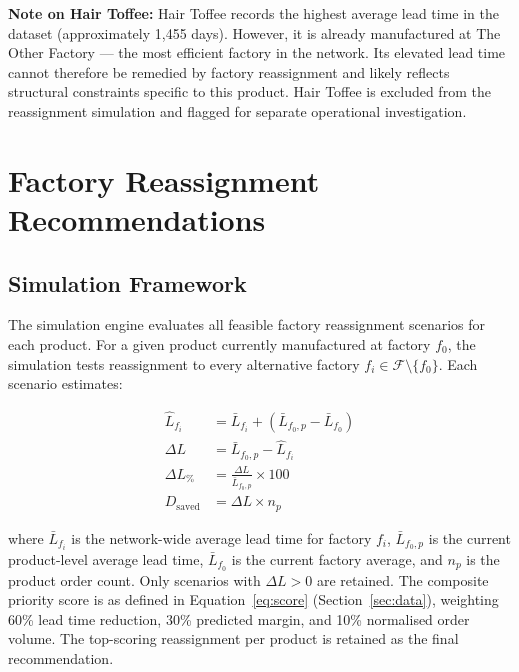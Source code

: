 \documentclass[12pt, a4paper]{article}
\begin{document}
\textbf{Note on Hair Toffee:} Hair Toffee records the
highest average lead time in the dataset
(approximately 1,455 days). However, it is already
manufactured at The Other Factory --- the most efficient
factory in the network. Its elevated lead time cannot
therefore be remedied by factory reassignment and likely
reflects structural constraints specific to this product.
Hair Toffee is excluded from the reassignment simulation
and flagged for separate operational investigation.

\section{Factory Reassignment Recommendations}
\label{sec:recommendations}

\subsection{Simulation Framework}

The simulation engine evaluates all feasible factory
reassignment scenarios for each product. For a given product
currently manufactured at factory $f_0$, the simulation tests
reassignment to every alternative factory
$f_i \in \mathcal{F} \setminus \{f_0\}$. Each scenario
estimates:

\begin{align}
    \hat{L}_{f_i} &= \bar{L}_{f_i} +
        (\bar{L}_{f_0,p} - \bar{L}_{f_0})
        \label{eq:pred_lt} \\
    \Delta L &= \bar{L}_{f_0,p} - \hat{L}_{f_i}
        \label{eq:reduction} \\
    \Delta L_{\%} &= \frac{\Delta L}{\bar{L}_{f_0,p}}
        \times 100
        \label{eq:pct} \\
    D_{\text{saved}} &= \Delta L \times n_p
        \label{eq:days_saved}
\end{align}

where $\bar{L}_{f_i}$ is the network-wide average lead time
for factory $f_i$, $\bar{L}_{f_0,p}$ is the current
product-level average lead time, $\bar{L}_{f_0}$ is the
current factory average, and $n_p$ is the product order count.
Only scenarios with $\Delta L > 0$ are retained.
The composite priority score is as defined in
Equation~\ref{eq:score} (Section~\ref{sec:data}), weighting
60\% lead time reduction, 30\% predicted margin, and 10\%
normalised order volume. The top-scoring reassignment per
product is retained as the final recommendation.
\end{document}
